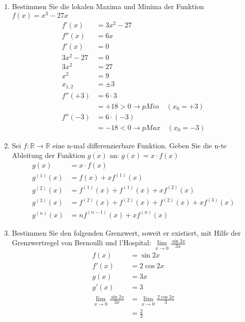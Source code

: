 \documentclass[12pt]{article}
\begin{document}
\begin{enumerate}[start=1,label={\bfseries Frage \arabic*:},leftmargin=1in]
    \item Bestimmen Sie die lokalen Maxima und Minima der Funktion $f(x)=x^{3} - 27x$
    \begin{align*}
        f'(x)&=3x^{2} - 27 \\
        f''(x)&=6x \\
        f'(x)&=0 \\
        3x^{2} -27 &= 0 \\
        3x^{2} &= 27 \\
        x^{2} &= 9 \\
        x_{1,2} &= \pm{3} \\
        f''(+3) &= 6 \cdot 3 \\
        &= +18 > 0 \to pMin \quad (x_0 = +3) \\
        f''(-3) &= 6 \cdot (-3) \\
        &= -18 < 0 \to pMax \quad (x_0 = -3)
    \end{align*}

    \item Sei $f:\mathbb{R} \to \mathbb{R}$ eine n-mal differenzierbare Funktion. Geben Sie die n-te Ableitung der Funktion $g(x)$ an: $g(x)=x \cdot f(x)$
    \begin{align*}
        g(x)&=x \cdot f(x) \\
        g^{(1)}(x)&=f(x) + xf^{(1)}(x) \\
        g^{(2)}(x)&=f^{(1)}(x) +  f^{(1)}(x) + xf^{(2)}(x) \\
        g^{(3)}(x)&=f^{(2)}(x) +  f^{(2)}(x) + f^{(2)}(x) + xf^{(3)}(x) \\
        g^{(n)}(x)&=nf^{(n-1)}(x) + xf^{(n)}(x)
    \end{align*}

    \item Bestimmen Sie den folgenden Grenzwert, soweit er existiert, mit Hilfe der Grenzwertregel von Bernoulli und l'Hospital: $\lim\limits_{x \to 0} \frac{\sin{2x}}{3x}$
    \begin{align*}
        f(x)&=\sin{2x} \\
        f'(x)&=2\cos{2x} \\
        g(x)&=3x \\
        g'(x)&=3 \\
        \lim_{x \to 0} \frac{\sin{2x}}{3x} &= \lim_{x \to 0} \frac{2\cos{2x}}{3} \\
        &= \frac{2}{3}
    \end{align*}

    \enlargethispage{-\baselineskip}
    \enlargethispage{-\baselineskip}
    \enlargethispage{-\baselineskip}
    \enlargethispage{-\baselineskip}


\end{enumerate}
\end{document}
